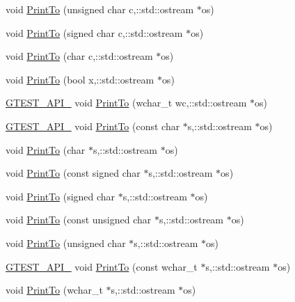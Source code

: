 \begin{DoxyCompactItemize}
\item 
void \hyperlink{namespacetesting_1_1internal_a5f9c0007343edeecab8e18be2d27f26d}{\-Print\-To} (unsigned char c,\-::std\-::ostream $\ast$os)
\item 
void \hyperlink{namespacetesting_1_1internal_a16c1e1401b5c161a1e44953aa25814d9}{\-Print\-To} (signed char c,\-::std\-::ostream $\ast$os)
\item 
void \hyperlink{namespacetesting_1_1internal_a3b408c5b5da4d12699a5443224b2edd8}{\-Print\-To} (char c,\-::std\-::ostream $\ast$os)
\item 
void \hyperlink{namespacetesting_1_1internal_a7ebc064bc9b42f44aa34c28022fc8832}{\-Print\-To} (bool x,\-::std\-::ostream $\ast$os)
\item 
\hyperlink{gtest-port_8h_aa73be6f0ba4a7456180a94904ce17790}{\-G\-T\-E\-S\-T\-\_\-\-A\-P\-I\-\_\-} void \hyperlink{namespacetesting_1_1internal_ad87b5481c689f33a1382c7dcf607ce6e}{\-Print\-To} (wchar\-\_\-t wc,\-::std\-::ostream $\ast$os)
\item 
\hyperlink{gtest-port_8h_aa73be6f0ba4a7456180a94904ce17790}{\-G\-T\-E\-S\-T\-\_\-\-A\-P\-I\-\_\-} void \hyperlink{namespacetesting_1_1internal_a61865a2802dffb84d7faa78a8775bc89}{\-Print\-To} (const char $\ast$s,\-::std\-::ostream $\ast$os)
\item 
void \hyperlink{namespacetesting_1_1internal_a1f60b0f1ac4205cdde34f1bc8005c5fb}{\-Print\-To} (char $\ast$s,\-::std\-::ostream $\ast$os)
\item 
void \hyperlink{namespacetesting_1_1internal_a0eb87a323c4e14acd4d09d61bf716627}{\-Print\-To} (const signed char $\ast$s,\-::std\-::ostream $\ast$os)
\item 
void \hyperlink{namespacetesting_1_1internal_a96884590131ec3a4c30740563a425a0e}{\-Print\-To} (signed char $\ast$s,\-::std\-::ostream $\ast$os)
\item 
void \hyperlink{namespacetesting_1_1internal_a5784040e3465fa10172276e71e3029be}{\-Print\-To} (const unsigned char $\ast$s,\-::std\-::ostream $\ast$os)
\item 
void \hyperlink{namespacetesting_1_1internal_a68d91693d3fe54e0a6278616107622b3}{\-Print\-To} (unsigned char $\ast$s,\-::std\-::ostream $\ast$os)
\item 
\hyperlink{gtest-port_8h_aa73be6f0ba4a7456180a94904ce17790}{\-G\-T\-E\-S\-T\-\_\-\-A\-P\-I\-\_\-} void \hyperlink{namespacetesting_1_1internal_abf5f1ea4f735216f44f0b91049263238}{\-Print\-To} (const wchar\-\_\-t $\ast$s,\-::std\-::ostream $\ast$os)
\item 
void \hyperlink{namespacetesting_1_1internal_a042e6621c2d5491b647eb9e7e8ee7e00}{\-Print\-To} (wchar\-\_\-t $\ast$s,\-::std\-::ostream $\ast$os)

\end{DoxyCompactItemize}
